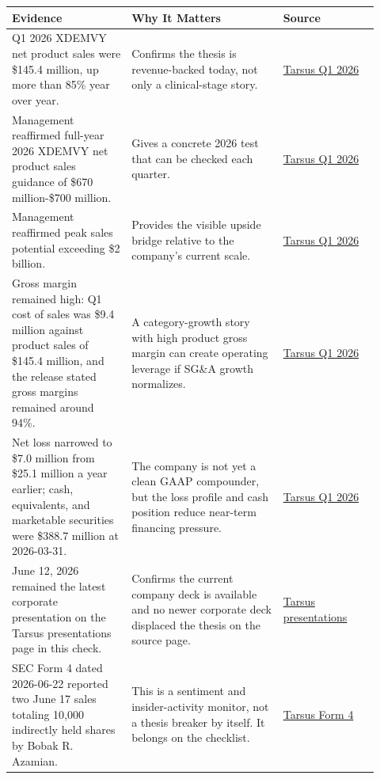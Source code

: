 \documentclass[
  9pt,
]{article}
\begin{document}
\small
\begin{longtable}[]{@{}L{0.30\linewidth}L{0.38\linewidth}L{0.24\linewidth}@{}}
\toprule
Evidence & Why It Matters & Source \\
\midrule
\endhead
Q1 2026 XDEMVY net product sales were \$145.4 million, up more than 85\%
year over year. & Confirms the thesis is revenue-backed today, not only
a clinical-stage story. &
\href{https://ir.tarsusrx.com/news-releases/news-release-details/tarsus-reports-first-quarter-2026-financial-results-and-recent/}{Tarsus
Q1 2026} \\
Management reaffirmed full-year 2026 XDEMVY net product sales guidance
of \$670 million-\$700 million. & Gives a concrete 2026 test that can be
checked each quarter. &
\href{https://ir.tarsusrx.com/news-releases/news-release-details/tarsus-reports-first-quarter-2026-financial-results-and-recent/}{Tarsus
Q1 2026} \\
Management reaffirmed peak sales potential exceeding \$2 billion. &
Provides the visible upside bridge relative to the company's current
scale. &
\href{https://ir.tarsusrx.com/news-releases/news-release-details/tarsus-reports-first-quarter-2026-financial-results-and-recent/}{Tarsus
Q1 2026} \\
Gross margin remained high: Q1 cost of sales was \$9.4 million against
product sales of \$145.4 million, and the release stated gross margins
remained around 94\%. & A category-growth story with high product gross
margin can create operating leverage if SG\&A growth normalizes. &
\href{https://ir.tarsusrx.com/news-releases/news-release-details/tarsus-reports-first-quarter-2026-financial-results-and-recent/}{Tarsus
Q1 2026} \\
Net loss narrowed to \$7.0 million from \$25.1 million a year earlier;
cash, equivalents, and marketable securities were \$388.7 million at
2026-03-31. & The company is not yet a clean GAAP compounder, but the
loss profile and cash position reduce near-term financing pressure. &
\href{https://ir.tarsusrx.com/news-releases/news-release-details/tarsus-reports-first-quarter-2026-financial-results-and-recent/}{Tarsus
Q1 2026} \\
June 12, 2026 remained the latest corporate presentation on the Tarsus
presentations page in this check. & Confirms the current company deck is
available and no newer corporate deck displaced the thesis on the source
page. &
\href{https://ir.tarsusrx.com/events-and-presentations/presentations/}{Tarsus
presentations} \\
SEC Form 4 dated 2026-06-22 reported two June 17 sales totaling 10,000
indirectly held shares by Bobak R. Azamian. & This is a sentiment and
insider-activity monitor, not a thesis breaker by itself. It belongs on
the checklist. &
\href{https://www.sec.gov/Archives/edgar/data/1819790/000182767226000009/wk-form4_1782158996.xml}{Tarsus
Form 4} \\
\bottomrule
\end{longtable}
\normalsize
\end{document}
